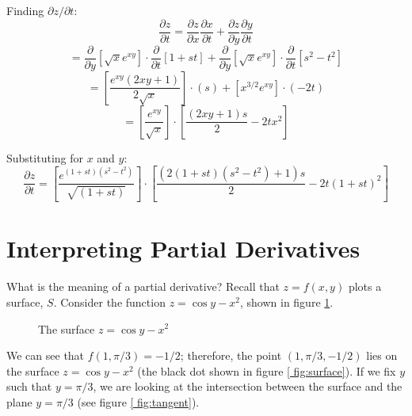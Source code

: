 \begin{Answer}[ref = chain]
\begin{enumerate}
    Finding $\partial z / \partial t$:
    $$\frac{\partial z}{\partial t} = \frac{\partial z}{\partial x} \frac{
    \partial x}{\partial t} + \frac{\partial z}{\partial y}\frac{\partial y}{
    \partial t}$$
    $$= \frac{\partial}{\partial y} \left[ \sqrt{x}e^{xy} \right] \cdot \frac{
    \partial}{\partial t} \left[ 1 + st \right] + \frac{\partial}{\partial y} 
    \left[ \sqrt{x}e^{xy} \right] \cdot \frac{\partial}{\partial t} \left[ s^2 
    - t^2 \right]$$
    $$= \left[ \frac{e^{xy} \left( 2xy + 1 \right)}{2\sqrt{x}} \right] \cdot 
    \left( s \right) + \left[ x^{3/2}e^{xy} \right] \cdot \left( -2t \right)$$
    $$= \left[ \frac{e^{xy}}{\sqrt{x}} \right] \cdot \left[ \frac{\left( 2xy + 
    1 \right)s}{2} - 2tx^2 \right]$$

    Substituting for $x$ and $y$:
    $$\frac{\partial z}{\partial t} = \left[ \frac{e^{\left( 1 + st \right) 
    \left( s^2 - t^2 \right)}}{\sqrt{\left( 1 + st \right)}} \right] \cdot 
    \left[ \frac{\left( 2\left( 1 + st \right) \left( s^2 - t^2 \right) + 1 
    \right)s}{2} - 2t \left( 1 + st \right)^2 \right]$$
\end{enumerate}
\end{Answer}

\section{Interpreting Partial Derivatives}
What is the meaning of a partial derivative? Recall that $z = f(x, y)$ plots a 
surface, $S$. Consider the function $z = \cos{y} - x^2$, shown in figure 
\ref{fig:surface}.

\begin{figure}[htbp]
    \centering
    \caption{The surface $z = \cos{y} - x^2$}
    \label{fig:surface}
\end{figure}

We can see that $f(1, \pi/3) = -1/2$; therefore, the point $(1, \pi/3, -1/2)$ 
lies on the surface $z = \cos{y} - x^2$ (the black dot shown in figure \ref{
fig:surface}). If we fix $y$ such that $y = \pi/3$, we are looking at the 
intersection between the surface and the plane $y = \pi/3$ (see figure \ref{
fig:tangent}). 

